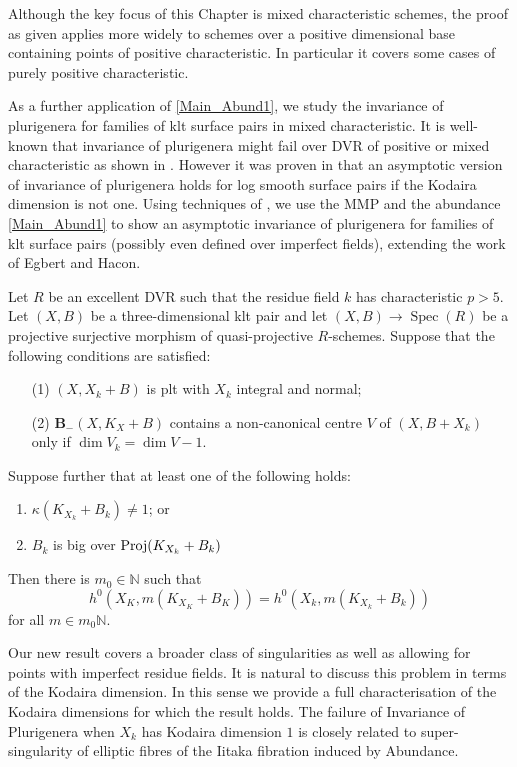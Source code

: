 \documentclass[a4paper,12pt]{book}
\DeclareMathOperator{\Spec}{Spec}
\begin{document}
	Although the key focus of this Chapter is mixed characteristic schemes, the proof as given applies more widely to schemes over a positive dimensional base containing points of positive characteristic. In particular it covers some cases of purely positive characteristic.
	
	As a further application of \autoref{Main_Abund1}, we study the invariance of plurigenera for families of klt surface pairs in mixed characteristic.
	It is well-known that invariance of plurigenera might fail over DVR of positive or mixed characteristic as shown in \cite{KU, Suh08, Bri20}.
	However it was proven in \cite{EH} that an asymptotic version of invariance of plurigenera holds for log smooth surface pairs if the Kodaira dimension is not one.
	Using techniques of \cite{HMX18}, we use the MMP and the abundance \autoref{Main_Abund1} to show an asymptotic invariance of plurigenera for families of klt surface pairs (possibly even defined over imperfect fields), extending the work of Egbert and Hacon.
	
	\begin{theo}\label{Main_Abund2}
		Let $R$ be an excellent DVR such that the residue field $k$ has characteristic $p>5$.
		Let $(X,B)$ be a three-dimensional klt pair and let $(X,B)\to \Spec(R)$ be a projective surjective morphism of quasi-projective $R$-schemes.  Suppose that the following conditions are satisfied:
		
		\begin{enumerate}
			\item[(1)] $(X,X_{k}+B)$ is plt with $X_k$ integral and normal;
			\item[(2)] ${\mathbf{B}_{-}(X, K_{X}+B)}$ contains a non-canonical centre $V$ of $(X,B+X_{k})$ only if $\dim V_{k}=\dim V -1$.
		\end{enumerate}
		
		Suppose further that at least one of the following holds:
		\begin{enumerate}
			\item $\kappa(K_{X_{k}}+B_{k}) \neq 1$; or
			\item $B_{k}$ is big over $\textup{Proj}(K_{X_{k}}+B_{k})$
		\end{enumerate}	
		Then there is $m_{0} \in \mathbb{N}$ such that 
		$$h^{0}(X_{K},m(K_{X_{K}}+B_{K}))=h^{0}(X_{k},m(K_{X_{k}}+B_{k}))$$
		for all $m \in m_{0}\mathbb{N}$.
		
	\end{theo}
	
	Our new result covers a broader class of singularities as well as allowing for points with imperfect residue fields. It is natural to discuss this problem in terms of the Kodaira dimension. In this sense we provide a full characterisation of the Kodaira dimensions for which the result holds. The failure of Invariance of Plurigenera when $X_{k}$ has Kodaira dimension $1$ is closely related to super-singularity of elliptic fibres of the Iitaka fibration induced by Abundance. 
	
\end{document}
